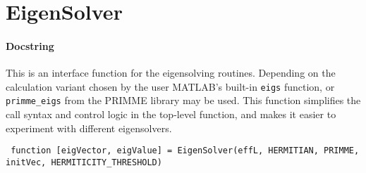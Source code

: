  \section{EigenSolver}
 \paragraph{Docstring} This is an interface function for the eigensolving routines. Depending on the calculation variant chosen by the user MATLAB's built-in \lstinline$eigs$ function, or \lstinline$primme_eigs$ from the PRIMME library may be used. This function simplifies the call syntax and control logic in the top-level function, and makes it easier to experiment with different eigensolvers.
 \begin{lstlisting}
 function [eigVector, eigValue] = EigenSolver(effL, HERMITIAN, PRIMME, initVec, HERMITICITY_THRESHOLD) \end{lstlisting}
